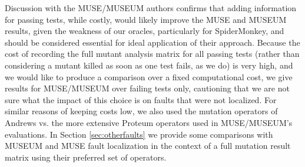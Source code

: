 Discussion with the MUSE/MUSEUM authors confirms  that adding information for passing tests, while costly, would likely improve the MUSE and MUSEUM results, given the weakness of our oracles, particularly for SpiderMonkey, and should be considered essential for ideal application of their approach.  Because the cost of recording the full mutant analysis matrix for all passing tests (rather than considering a mutant killed as soon as one test fails, as we do) is very high, and we would like to produce a comparison over a fixed computational cost, we give results for MUSE/MUSEUM over failing tests only, cautioning that we are not sure what the impact of this choice is on faults that were not localized.  For similar reasons of keeping costs low, we also used the mutation operators of Andrews vs. the more extensive Proteum \cite{Proteum} operators used in MUSE/MUSEUM's evaluations.    In Section \ref{sec:otherfaults} we provide some comparisons with MUSEUM and MUSE fault localization in the context of a full mutation result matrix using their preferred set of operators.



